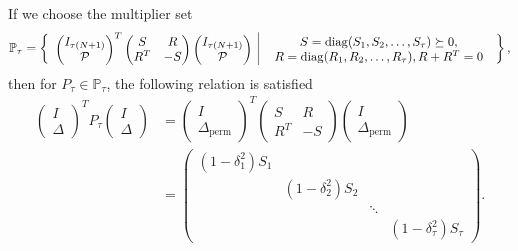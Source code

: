 If we choose the multiplier set 
\begin{align}
\mathbb{P}_\tau =\left\{\begin{array}{c|c}
  \begin{pmatrix}
  I_{\tau(N+1)} \\ \mathcal{P}
  \end{pmatrix}^T  
  \begin{pmatrix}
S & R \\ R^T & -S
\end{pmatrix}
\begin{pmatrix}
I_{\tau (N+1)} \\ \mathcal{P}
\end{pmatrix}
& \; \begin{array}{c} S = \operatorname*{diag}(S_1, S_2, \dots, S_\tau)\succeq 0,\\ R = \operatorname*{diag}(R_1, R_2, \dots, R_\tau), R + R^T = 0\end{array} \end{array}
\right\},
\end{align}
then for $P_\tau \in \mathbb{P}_\tau$,  the following relation is satisfied
\begin{align}
\begin{pmatrix}
I \\ \Delta
\end{pmatrix}^T
P_\tau
\begin{pmatrix}
I \\ \Delta
\end{pmatrix}
&=
\begin{pmatrix}
I \\ \Delta_\text{perm}
\end{pmatrix}^T
\begin{pmatrix}
S & R \\ R^T & -S
\end{pmatrix}
\begin{pmatrix}
I \\ \Delta_\text{perm}
\end{pmatrix}\\
&= 
\begin{pmatrix}
(1 - \delta_1^2)S_1 & & &\\
& (1 - \delta_2^2) S_2 & & \\
& & \ddots & \\
& & & (1- \delta_\tau^2) S_\tau
\end{pmatrix}.
\end{align}






